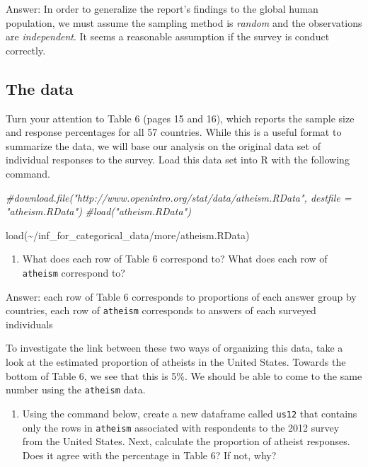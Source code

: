 \documentclass[
]{article}
\newenvironment{Shaded}{\begin{snugshade}}{\end{snugshade}}
\newcommand{\CommentTok}[1]{\textcolor[rgb]{0.56,0.35,0.01}{\textit{#1}}}
\newcommand{\FunctionTok}[1]{\textcolor[rgb]{0.00,0.00,0.00}{#1}}
\newcommand{\NormalTok}[1]{#1}
\newcommand{\StringTok}[1]{\textcolor[rgb]{0.31,0.60,0.02}{#1}}
\providecommand{\tightlist}{%
  \setlength{\itemsep}{0pt}\setlength{\parskip}{0pt}}
\begin{document}
Answer: In order to generalize the report's findings to the global human
population, we must assume the sampling method is \emph{random} and the
observations are \emph{independent}. It seems a reasonable assumption if
the survey is conduct correctly.

\hypertarget{the-data}{%
\subsection{The data}\label{the-data}}

Turn your attention to Table 6 (pages 15 and 16), which reports the
sample size and response percentages for all 57 countries. While this is
a useful format to summarize the data, we will base our analysis on the
original data set of individual responses to the survey. Load this data
set into R with the following command.

\begin{Shaded}
\begin{Highlighting}[]
\CommentTok{\#download.file("http://www.openintro.org/stat/data/atheism.RData", destfile = "atheism.RData")}
\CommentTok{\#load("atheism.RData")}

\FunctionTok{load}\NormalTok{(}\StringTok{\textquotesingle{}\textasciitilde{}/inf\_for\_categorical\_data/more/atheism.RData\textquotesingle{}}\NormalTok{)}
\end{Highlighting}
\end{Shaded}

\begin{enumerate}
\def\labelenumi{\arabic{enumi}.}
\setcounter{enumi}{2}
\tightlist
\item
  What does each row of Table 6 correspond to? What does each row of
  \texttt{atheism} correspond to?
\end{enumerate}

Answer: each row of Table 6 corresponds to proportions of each answer
group by countries, each row of \texttt{atheism} corresponds to answers
of each surveyed individuals

To investigate the link between these two ways of organizing this data,
take a look at the estimated proportion of atheists in the United
States. Towards the bottom of Table 6, we see that this is 5\%. We
should be able to come to the same number using the \texttt{atheism}
data.

\begin{enumerate}
\def\labelenumi{\arabic{enumi}.}
\setcounter{enumi}{3}
\tightlist
\item
  Using the command below, create a new dataframe called \texttt{us12}
  that contains only the rows in \texttt{atheism} associated with
  respondents to the 2012 survey from the United States. Next, calculate
  the proportion of atheist responses. Does it agree with the percentage
  in Table 6? If not, why?
\end{enumerate}
\end{document}
